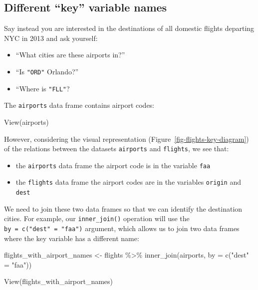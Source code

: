 \documentclass[
  letterpaper,
  DIV=11,
  numbers=noendperiod]{scrreprt}
\newenvironment{Shaded}{\begin{snugshade}}{\end{snugshade}}
\newcommand{\AttributeTok}[1]{\textcolor[rgb]{0.40,0.45,0.13}{#1}}
\newcommand{\FunctionTok}[1]{\textcolor[rgb]{0.28,0.35,0.67}{#1}}
\newcommand{\NormalTok}[1]{\textcolor[rgb]{0.00,0.23,0.31}{#1}}
\newcommand{\OtherTok}[1]{\textcolor[rgb]{0.00,0.23,0.31}{#1}}
\newcommand{\SpecialCharTok}[1]{\textcolor[rgb]{0.37,0.37,0.37}{#1}}
\newcommand{\StringTok}[1]{\textcolor[rgb]{0.13,0.47,0.30}{#1}}
\providecommand{\tightlist}{%
  \setlength{\itemsep}{0pt}\setlength{\parskip}{0pt}}\usepackage{longtable,booktabs,array}
\theoremstyle{definition}
\theoremstyle{remark}
\begin{document}
\hypertarget{sec-diff-key}{%
\subsection{Different ``key'' variable names}\label{sec-diff-key}}

Say instead you are interested in the destinations of all domestic
flights departing NYC in 2013 and ask yourself:

\begin{itemize}
\tightlist
\item
  ``What cities are these airports in?''
\item
  ``Is \texttt{"ORD"} Orlando?''
\item
  ``Where is \texttt{"FLL"}?
\end{itemize}

The \texttt{airports} data frame contains airport codes:

\begin{Shaded}
\begin{Highlighting}[]
\FunctionTok{View}\NormalTok{(airports)}
\end{Highlighting}
\end{Shaded}

However, considering the visual representation
(Figure~\ref{fig-flights-key-diagram}) of the relations between the
datasets \texttt{airports} and \texttt{flights}, we see that:

\begin{itemize}
\tightlist
\item
  the \texttt{airports} data frame the airport code is in the variable
  \texttt{faa}
\item
  the \texttt{flights} data frame the airport codes are in the variables
  \texttt{origin} and \texttt{dest}
\end{itemize}

We need to join these two data frames so that we can identify the
destination cities. For example, our \texttt{inner\_join()} operation
will use the \texttt{by\ =\ c("dest"\ =\ "faa")} argument, which allows
us to join two data frames where the key variable has a different name:

\begin{Shaded}
\begin{Highlighting}[]
\NormalTok{flights\_with\_airport\_names }\OtherTok{\textless{}{-}}\NormalTok{  flights }\SpecialCharTok{\%\textgreater{}\%} 
  \FunctionTok{inner\_join}\NormalTok{(airports, }\AttributeTok{by =} \FunctionTok{c}\NormalTok{(}\StringTok{"dest"} \OtherTok{=} \StringTok{"faa"}\NormalTok{))}

\FunctionTok{View}\NormalTok{(flights\_with\_airport\_names)}
\end{Highlighting}
\end{Shaded}
\end{document}
